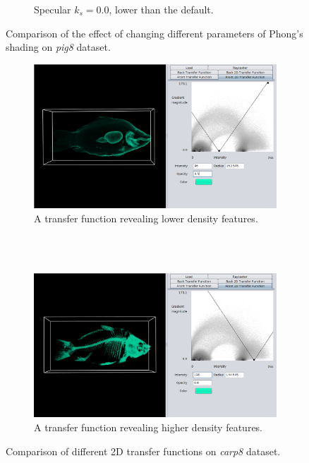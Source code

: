 \documentclass[a4paper]{article}
\begin{document}
\begin{figure}[h]
\begin{subfigure}[b]{0.45\textwidth}
    \caption{Specular $k_s=0.0$, lower than the default.}
  \end{subfigure}
  \caption{Comparison of the effect of changing different parameters of Phong's shading on \textit{pig8} dataset.}
  \label{fig:phong}
\end{figure}

\begin{figure}[h]
  \centering
  \begin{subfigure}[b]{\textwidth}
    \includegraphics[width=\textwidth]{2dtf}
    \caption{A transfer function revealing lower density features.}
  \end{subfigure}
  \\~\\
  \begin{subfigure}[b]{\textwidth}
    \includegraphics[width=\textwidth]{2dtf-skeleton}
    \caption{A transfer function revealing higher density features.}
  \end{subfigure}
  \caption{Comparison of different 2D transfer functions on \textit{carp8} dataset.}
  \label{fig:2dtf}
\end{figure}
\end{document}
